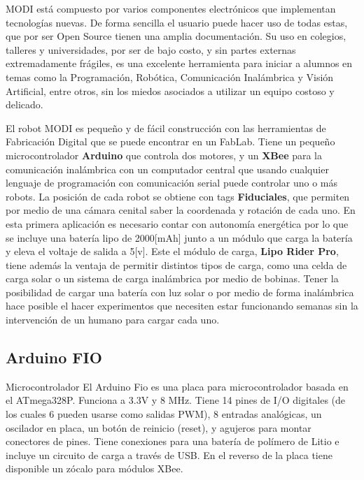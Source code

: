 MODI está compuesto por varios componentes electrónicos que implementan tecnologías nuevas. De forma sencilla el usuario puede hacer uso de todas estas, que por ser Open Source tienen una amplia documentación. Su uso en colegios, talleres y universidades, por ser de bajo costo, y sin partes externas extremadamente frágiles, es una excelente herramienta para iniciar a alumnos en temas como la Programación, Robótica, Comunicación Inalámbrica y Visión Artificial, entre otros, sin los miedos asociados a utilizar un equipo costoso y delicado.

El robot MODI es pequeño y de fácil construcción con las herramientas de Fabricación Digital que se puede encontrar en un FabLab. Tiene un pequeño microcontrolador \textbf{Arduino} que controla dos motores, y un \textbf{XBee} para la comunicación inalámbrica con un computador central que usando cualquier lenguaje de programación con comunicación serial puede controlar uno o más robots. La posición de cada robot se obtiene con tags \textbf{Fiduciales}, que permiten por medio de una cámara cenital saber la coordenada y rotación de cada uno. En esta primera aplicación es necesario contar con autonomía energética por lo que se incluye una batería lipo de 2000[mAh] junto a un módulo que carga la batería y eleva el voltaje de salida a 5[v]. Este el módulo de carga, \textbf{Lipo Rider Pro}, tiene además la ventaja de permitir distintos tipos de carga, como una celda de carga solar o un sistema de carga inalámbrica por medio de bobinas. Tener la posibilidad de cargar una batería con luz solar o por medio de forma inalámbrica hace posible el hacer experimentos que necesiten estar funcionando semanas sin la intervención de un humano para cargar cada uno.

\subsection{Arduino FIO}

Microcontrolador
El Arduino Fio es una placa para microcontrolador basada en el ATmega328P. Funciona a 3.3V y 8 MHz. Tiene 14 pines de I/O digitales (de los cuales 6 pueden usarse como salidas PWM), 8 entradas analógicas, un oscilador en placa, un botón de reinicio (reset), y agujeros para montar conectores de pines. Tiene conexiones para una batería de polímero de Litio e incluye un circuito de carga a través de USB. En el reverso de la placa tiene disponible un zócalo para módulos XBee.

